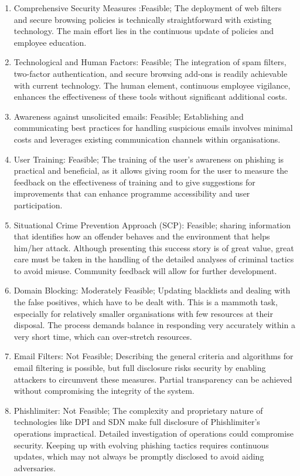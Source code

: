\begin{enumerate}
    
    \item Comprehensive Security Measures :Feasible; The deployment of web filters and secure browsing policies is technically straightforward with existing technology. The main effort lies in the continuous update of policies and employee education.
    \item Technological and Human Factors: Feasible; The integration of spam filters, two-factor authentication, and secure browsing add-ons is readily achievable with current technology. The human element, continuous employee vigilance, enhances the effectiveness of these tools without significant additional costs.
    \item Awareness against unsolicited emails: Feasible; Establishing and communicating best practices for handling suspicious emails involves minimal costs and leverages existing communication channels within organisations.

     \item User Training: Feasible; The training of the user's awareness on phishing is practical and beneficial, as it allows giving room for the user to measure the feedback on the effectiveness of training and to give suggestions for improvements that can enhance programme accessibility and user participation.
     
     \item Situational Crime Prevention Approach (SCP): Feasible; sharing information that identifies how an offender behaves and the environment that helps him/her attack. Although presenting this success story is of great value, great care must be taken in the handling of the detailed analyses of criminal tactics to avoid misuse. Community feedback will allow for further development.
     
     \item Domain Blocking: Moderately Feasible; Updating blacklists and dealing with the false positives, which have to be dealt with. This is a mammoth task, especially for relatively smaller organisations with few resources at their disposal. The process demands balance in responding very accurately within a very short time, which can over-stretch resources.
     
    \item Email Filters: Not Feasible;  Describing the general criteria and algorithms for email filtering is possible, but full disclosure risks security by enabling attackers to circumvent these measures. Partial transparency can be achieved without compromising the integrity of the system.
    
    \item Phishlimiter: Not Feasible; The complexity and proprietary nature of technologies like DPI and SDN make full disclosure of Phishlimiter's operations impractical. Detailed investigation of operations could compromise security. Keeping up with evolving phishing tactics requires continuous updates, which may not always be promptly disclosed to avoid aiding adversaries.
    
\end{enumerate}


